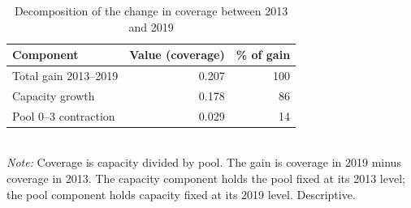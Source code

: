 \begin{table}[htbp]\centering
\caption{Decomposition of the change in coverage between 2013 and 2019}
\label{tab:S6d_decomp}
\small
\begin{tabular}{lrr}
\toprule
Component & Value (coverage) & \% of gain \\
\midrule
Total gain 2013--2019 & 0.207 & 100 \\
\midrule
Capacity growth & 0.178 & 86 \\
Pool 0--3 contraction & 0.029 & 14 \\
\bottomrule
\end{tabular}
\\[3pt]{\footnotesize \textit{Note:} Coverage is capacity divided by pool. The gain is coverage in 2019 minus coverage in 2013. The capacity component holds the pool fixed at its 2013 level; the pool component holds capacity fixed at its 2019 level. Descriptive.}
\end{table}
